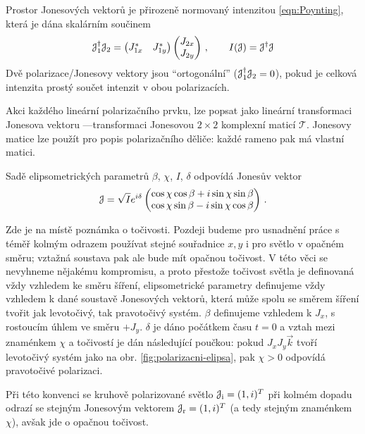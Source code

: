 Prostor Jonesových vektorů je přirozeně normovaný intenzitou \eqref{eqn:Poynting}, která je dána skalárním součinem
\begin{equation}
    \mathcal{J}_1^\dagger \mathcal{J}_2= \begin{pmatrix} J_{1x}^* & J_{1y}^* \end{pmatrix}
    \begin{pmatrix} J_{2x} \\ J_{2y} \end{pmatrix} \,, 
    \qquad I(\mathcal{J})=\mathcal{J}^\dagger \mathcal{J}
\end{equation}
Dvě polarizace/Jonesovy vektory jsou ``ortogonální'' ($\mathcal{J}_1^\dagger \mathcal{J}_2=0$), pokud je celková intenzita prostý součet intenzit v obou polarizacích.

Akci každého lineární polarizačního prvku, lze popsat jako lineární transformaci Jonesova vektoru ---\tododash transformaci Jonesovou $2\times 2$ komplexní maticí $\mathcal{T}$.
Jonesovy matice lze použít pro popis polarizačního děliče: každé rameno pak má vlastní matici.

Sadě elipsometrických parametrů $\beta$, $\chi$, $I$, $\delta$ odpovídá Jonesův vektor
\begin{equation} 
\label{eqn:Jones-elipsa}
    \mathcal{J}=\sqrt{I} e^{i\delta} \begin{pmatrix}
        \cos \chi \cos \beta + i \sin \chi \sin \beta \\
        \cos \chi \sin \beta - i \sin \chi \cos \beta
    \end{pmatrix} \,.
\end{equation}

Zde je na místě poznámka o točivosti.
Pozdeji budeme pro usnadnění práce s téměř kolmým odrazem používat stejné souřadnice $x,y$ i pro světlo v opačném směru; vztažná soustava pak ale bude mít opačnou točivost.
V této věci se nevyhneme nějakému kompromisu, a proto přestože točivost světla je definovaná vždy vzhledem ke směru šíření, elipsometrické parametry definujeme vždy vzhledem k dané soustavě Jonesových vektorů, která může spolu se směrem šíření tvořit jak levotočivý, tak pravotočivý systém.
$\beta$ definujeme vzhledem k $J_x$, s rostoucím úhlem ve směru $+J_y$.
$\delta$ je dáno počátkem času $t=0$ a vztah mezi znaménkem $\chi$ a točivostí je dán následující poučkou: pokud $J_x J_y \vec{k}$ tvoří levotočivý systém jako na obr. \ref{fig:polarizacni-elipsa}, pak $\chi>0$ odpovídá pravotočivé polarizaci.

Při této konvenci se kruhově polarizované světlo $\mathcal{J}_\textrm{i}=(1, i)^T$ při kolmém dopadu odrazí se stejným Jonesovým vektorem $\mathcal{J}_\textrm{r}=(1, i)^T$ (a tedy stejným znaménkem $\chi$), avšak jde o opačnou točivost.


